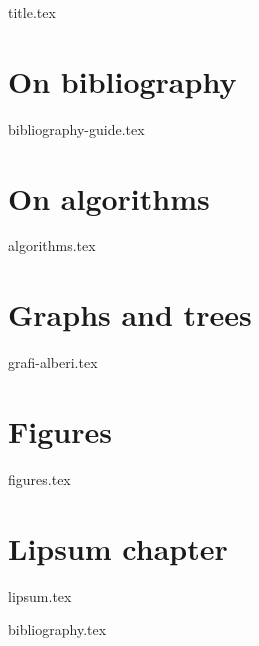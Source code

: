 \documentclass[a4paper,11pt,oneside]{book}
\begin{document}
 
\frontmatter
{title.tex}
 
\clearpage
\thispagestyle{empty}
 
\tableofcontents
 
\mainmatter

\chapter{On bibliography}
{bibliography-guide.tex}
 
\chapter{On algorithms}
{algorithms.tex}
 
\chapter{Graphs and trees}
{grafi-alberi.tex}
 
 
\chapter{Figures}
{figures.tex}
 
\chapter{Lipsum chapter}
{lipsum.tex}
 
\backmatter
 
{bibliography.tex}
 
\end{document}
